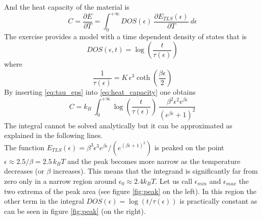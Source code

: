 \documentclass{article}
\begin{document}
And the heat capacity of the material is 
\begin{equation}
    C = \frac{\partial E}{\partial T} = \int_0^{+\infty} DOS(\epsilon) \ \frac{\partial E_{TLS}(\epsilon)}{\partial T} \ d\epsilon
    \label{eq:heat_capacity}
\end{equation}
The exercise provides a model with a time dependent density of states that is
\begin{equation}
    DOS(\epsilon, t) = \log\left(\frac{t}{\tau(\epsilon)}\right)
    \label{eq:DOS_t_dep}
\end{equation}
where
\begin{equation}
    \frac{1}{\tau(\epsilon)} = K \, \epsilon^3 \coth\left(\frac{\beta\epsilon}{2}\right)
    \label{eq:tau_eps}
\end{equation}
By inserting \ref{eq:tau_eps} into \ref{eq:heat_capacity} one obtains
\begin{equation}
    C = k_B \ \int_0^{+\infty} \log\left(\frac{t}{\tau(\epsilon)}\right) \ \frac{\beta^2\epsilon^2 e^{\beta\epsilon}}{(e^{\beta \epsilon} + 1)^2}
    \label{eq:big_integral}
\end{equation}
The integral cannot be solved analytically but it can be approximated as explained in the following lines. \\
The function $E_{TLS}(\epsilon) = \beta^3\epsilon^3e^{\beta\epsilon}/(e^{(\beta\epsilon + 1)^2})$ is peaked on the point
$\epsilon \approx 2.5/\beta = 2.5 \, k_B T$ and the peak becomes more narrow as the temperature decreases (or $\beta$ increases). This means that the integrand is significantly far from zero only 
in a narrow region around $\epsilon_0 \approx 2.4 k_B T$. Let us call $\epsilon_{min}$ and $\epsilon_{max}$ the two extrema of the peak area (see figure \ref{fig:peak} on the left). In this region the other term in the integral $DOS(\epsilon) = \log(t/\tau(\epsilon))$
is practically constant as can be seen in figure \ref{fig:peak} (on the right). 
\end{document}
